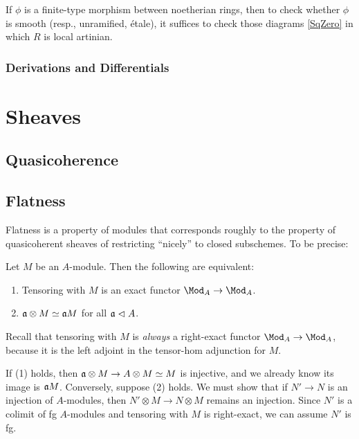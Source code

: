 \documentclass[10pt,final,oneside]{amsbook}
\makeatletter
\renewenvironment{proof}[1][\proofname] 
{ 	
	\par\pushQED{\qed}\normalfont\topsep6\p@\@plus6\p@\relax\trivlist\itemindent\normalparindent
	\item[\hskip\labelsep\itshape#1\@addpunct{.}]\ignorespaces
}
{
	\popQED\endtrivlist\@endpefalse
}
\numberwithin{equation}{section}
\makeatother
\begin{document}
\begin{prop}
If $\phi$ is a finite-type morphism between noetherian rings, then to check whether $\phi$ is smooth (resp., unramified, \'etale), it suffices to check those diagrams \eqref{SqZero} in which $R$ is local artinian.
\end{prop}

\subsubsection{Derivations and Differentials}

\newpage

\section{Sheaves}

\subsection{Quasicoherence}

\subsection{Flatness}

Flatness is a property of modules that corresponds roughly to the property of quasicoherent sheaves of restricting ``nicely'' to closed subschemes.
To be precise:

\begin{thm}
Let $M$ be an $A$-module.
Then the following are equivalent:
\begin{enumerate}
\item 	Tensoring with $M$ is an exact functor $\Mod_A \to \Mod_A$.
\item 	$\mathfrak{a} \otimes M \simeq \mathfrak{a}M$ for all $\mathfrak{a} \vartriangleleft A$.
\end{enumerate}
\end{thm}

\begin{rem}
Recall that tensoring with $M$ is \emph{always} a right-exact functor $\Mod_A \to \Mod_A$, because it is the left adjoint in the tensor-hom adjunction for $M$.
\end{rem}

\begin{proof}
If (1) holds, then $\mathfrak{a} \otimes M \to A \otimes M \simeq M$ is injective, and we already know its image is $\mathfrak{a}M$.
Conversely, suppose (2) holds.
We must show that if $N' \to N$ is an injection of $A$-modules, then $N' \otimes M \to N \otimes M$ remains an injection.
Since $N'$ is a colimit of fg $A$-modules and tensoring with $M$ is right-exact, we can assume $N'$ is fg.

\end{proof}
\end{document}
